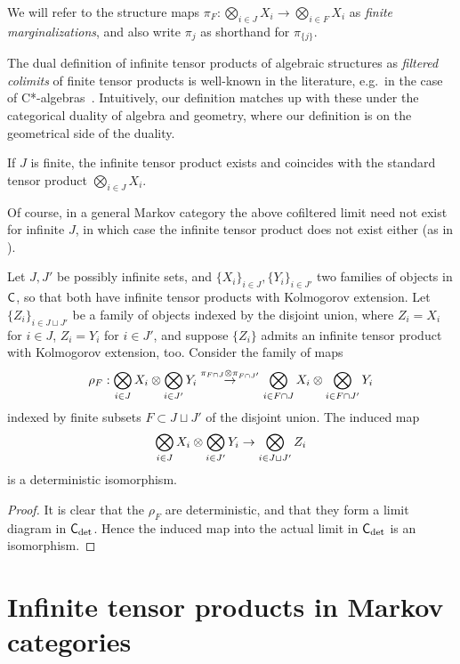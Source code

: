 \documentclass[11pt]{article}
\begin{document}
We will refer to the structure maps $\pi_F : \bigotimes_{i\in J} X_i \to \bigotimes_{i\in F} X_i$ as \emph{finite marginalizations}, and also write $\pi_j$ as shorthand for $\pi_{\{j\}}$.

The dual definition of infinite tensor products of algebraic structures as \emph{filtered colimits} of finite tensor products is well-known in the literature, e.g.~in the case of C*-algebras~\cite[p.~315]{blackadar}. Intuitively, our definition matches up with these under the categorical duality of algebra and geometry, where our definition is on the geometrical side of the duality.

\begin{remark}
	If $J$ is finite, the infinite tensor product exists and coincides with the standard tensor product $\bigotimes_{i \in J} X_i$.
\end{remark}

Of course, in a general Markov category the above cofiltered limit need not exist for infinite $J$, in which case the infinite tensor product does not exist either (as in ).

\begin{lemma}
    Let $J,J'$ be possibly infinite sets, and $\{X_i\}_{i\in J}, \{Y_i\}_{i\in J'}$ two families of objects in $\mathsf{C}$, so that both have infinite tensor products with Kolmogorov extension.
    Let $\{Z_i\}_{i\in J \sqcup J'}$ be a family of objects indexed by the disjoint union, where $Z_i = X_i$ for $i\in J$, $Z_i = Y_i$ for $i \in J'$,
    and suppose $\{Z_i\}$ admits an infinite tensor product with Kolmogorov extension, too.
    Consider the family of maps
    \[\rho_F: \bigotimes_{i\in J}X_i \otimes \bigotimes_{i\in J'} Y_i \overset{\pi_{F \cap J} \otimes \pi_{F \cap J'}}{\to} \bigotimes_{i \in F \cap J}X_i \otimes \bigotimes_{i\in F \cap J'}Y_i\]
    indexed by finite subsets $F \subset J \sqcup J'$ of the disjoint union.
    The induced map
    \[\bigotimes_{i\in J}X_i \otimes \bigotimes_{i\in J'} Y_i \to \bigotimes_{i \in J \sqcup J'} Z_i\]
    is a deterministic isomorphism.
\end{lemma}
\begin{proof}
    It is clear that the $\rho_F$ are deterministic, and that they form a limit diagram in $\mathsf{C}_{\rm det}$.
    Hence the induced map into the actual limit in $\mathsf{C}_{\rm det}$ is an isomorphism.
\end{proof}

\section{Infinite tensor products in Markov categories}
\label{infprod_markov}
\end{document}
